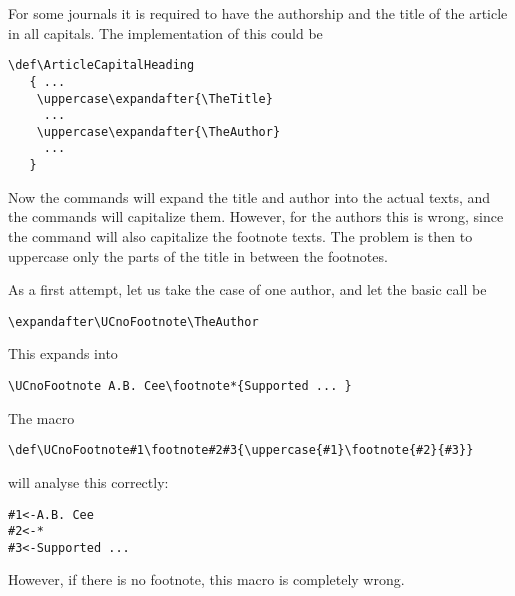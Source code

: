 For some journals it is required to
have the authorship and the title of the article in all capitals.
The implementation of this could be
\begin{verbatim}
\def\ArticleCapitalHeading
   { ...
    \uppercase\expandafter{\TheTitle}
     ...
    \uppercase\expandafter{\TheAuthor}
     ...
   }
\end{verbatim}
Now the  commands will expand the title and
author into the actual texts, and the  commands
will capitalize them. However, for the authors this is wrong,
since the  command will also capitalize the
footnote texts.
The problem is then to uppercase only the parts
of the title in between the footnotes.

As a first attempt, let us take the case of one author, and
let the basic call be
\begin{verbatim}
\expandafter\UCnoFootnote\TheAuthor
\end{verbatim}
This expands into
\begin{verbatim}
\UCnoFootnote A.B. Cee\footnote*{Supported ... }
\end{verbatim}
The macro
\begin{verbatim}
\def\UCnoFootnote#1\footnote#2#3{\uppercase{#1}\footnote{#2}{#3}}
\end{verbatim}
will analyse this correctly:
\begin{verbatim}
#1<-A.B. Cee
#2<-*
#3<-Supported ...
\end{verbatim}
However, if there is no footnote, this macro is completely wrong.

